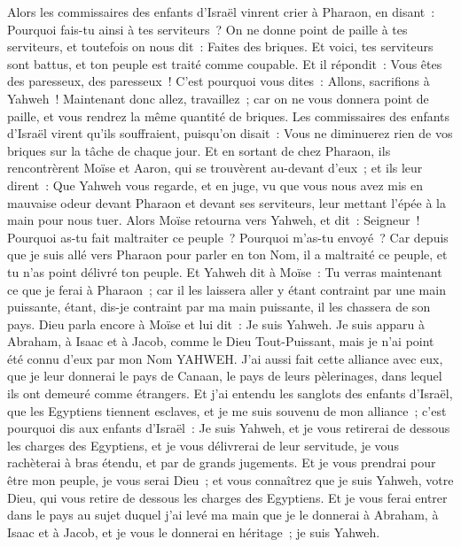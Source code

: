 \begin{multicols}{2}
Alors les commissaires des enfants d'Israël vinrent crier à Pharaon, en disant~: Pourquoi fais-tu ainsi à tes serviteurs~?
On ne donne point de paille à tes serviteurs, et toutefois on nous dit~: Faites des briques. Et voici, tes serviteurs sont battus, et ton peuple est traité comme coupable.
Et il répondit~: Vous êtes des paresseux, des paresseux~! C'est pourquoi vous dites~: Allons, sacrifions à Yahweh~!
Maintenant donc allez, travaillez~; car on ne vous donnera point de paille, et vous rendrez la même quantité de briques.
Les commissaires des enfants d'Israël virent qu'ils souffraient, puisqu'on disait~: Vous ne diminuerez rien de vos briques sur la tâche de chaque jour.
Et en sortant de chez Pharaon, ils rencontrèrent Moïse et Aaron, qui se trouvèrent au-devant d'eux~;
et ils leur dirent~: Que Yahweh vous regarde, et en juge, vu que vous nous avez mis en mauvaise odeur devant Pharaon et devant ses serviteurs, leur mettant l'épée à la main pour nous tuer.
Alors Moïse retourna vers Yahweh, et dit~: Seigneur~! Pourquoi as-tu fait maltraiter ce peuple~? Pourquoi m'as-tu envoyé~?
Car depuis que je suis allé vers Pharaon pour parler en ton Nom, il a maltraité ce peuple, et tu n'as point délivré ton peuple.
\VerseOne{}Et Yahweh dit à Moïse~: Tu verras maintenant ce que je ferai à Pharaon~; car il les laissera aller y étant contraint par une main puissante, étant, dis-je contraint par ma main puissante, il les chassera de son pays.
Dieu parla encore à Moïse et lui dit~: Je suis Yahweh.
Je suis apparu à Abraham, à Isaac et à Jacob, comme le Dieu Tout-Puissant, mais je n'ai point été connu d'eux par mon Nom YAHWEH.
J'ai aussi fait cette alliance avec eux, que je leur donnerai le pays de Canaan, le pays de leurs pèlerinages, dans lequel ils ont demeuré comme étrangers.
Et j'ai entendu les sanglots des enfants d'Israël, que les Egyptiens tiennent esclaves, et je me suis souvenu de mon alliance~;
c'est pourquoi dis aux enfants d'Israël~: Je suis Yahweh, et je vous retirerai de dessous les charges des Egyptiens, et je vous délivrerai de leur servitude, je vous rachèterai à bras étendu, et par de grands jugements.
Et je vous prendrai pour être mon peuple, je vous serai Dieu~; et vous connaîtrez que je suis Yahweh, votre Dieu, qui vous retire de dessous les charges des Egyptiens.
Et je vous ferai entrer dans le pays au sujet duquel j'ai levé ma main que je le donnerai à Abraham, à Isaac et à Jacob, et je vous le donnerai en héritage~; je suis Yahweh.

\end{multicols}
